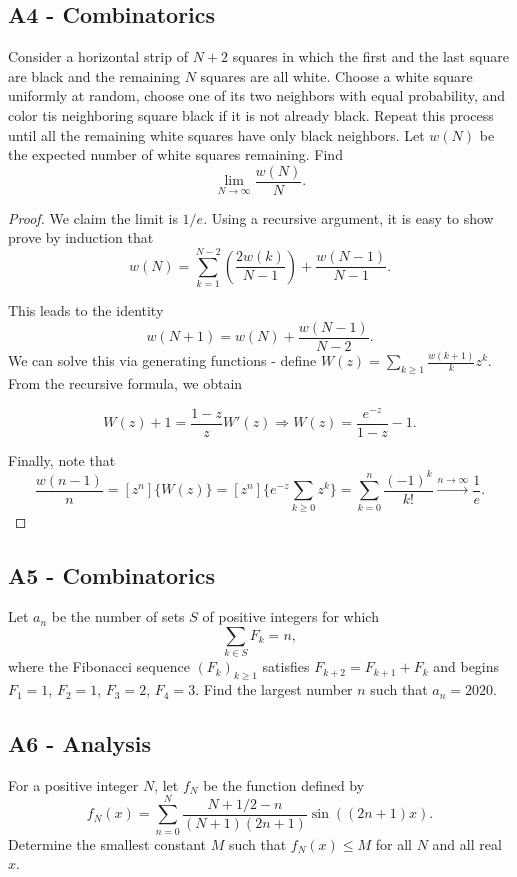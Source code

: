 \documentclass[11pt]{scrartcl}
\newcommand{\<}{\langle}
\renewcommand{\>}{\rangle}
\begin{document}
\subsection{A4 - Combinatorics}
Consider a horizontal strip of $N+2$ squares in which the first and the last square are black and the remaining $N$ squares are all white. Choose a white square uniformly at random, choose one of its two neighbors with equal probability, and color tis neighboring square black if it is not already black. Repeat this process until all the remaining white squares have only black neighbors. Let $w(N)$ be the expected number of white squares remaining. Find
\[ \lim_{N\to\infty}\frac{w(N)}{N}.\]
\begin{proof}
We claim the limit is $1/e$.  Using a recursive argument, it is easy to show prove by induction that 
$$w(N) =  \sum_{k=1}^{N-2}\left ( \frac{2w(k)}{N - 1} \right) + \frac{w(N - 1)}{N - 1}.$$

This leads to the identity
$$w(N + 1) = w(N) + \frac{w(N - 1)}{N - 2}.$$
We can solve this via generating functions - define $W(z) = \sum_{k \ge 1} \frac{w(k + 1)}{k} z^k$.  From the recursive formula, we obtain

$$W(z) + 1 = \frac{1-z}{z} W'(z) \Rightarrow W(z) = \frac{e^{-z}}{1 - z} - 1.$$

Finally, note that 
$$\frac{w(n-1)}{n} = [z^n]\{W(z)\} = [z^n] \{e^{-z} \sum_{k \ge 0} z^k\} = \sum_{k=0}^n \frac{(-1)^k}{k!} \xrightarrow{n \to \infty} \frac{1}{e}.$$
\end{proof}
\pagebreak
\subsection{A5 - Combinatorics}
Let $a_n$ be the number of sets $S$ of positive integers for which
\[ \sum_{k\in S}F_k=n,\]where the Fibonacci sequence $(F_k)_{k\ge 1}$ satisfies $F_{k+2}=F_{k+1}+F_k$ and begins $F_1=1$, $F_2=1$, $F_3=2$, $F_4=3$. Find the largest number $n$ such that $a_n=2020$.
\pagebreak
\subsection{A6 - Analysis}
For a positive integer $N$, let $f_N$ be the function defined by
\[ f_N (x)=\sum_{n=0}^N \frac{N+1/2-n}{(N+1)(2n+1)} \sin\left((2n+1)x \right). \]Determine the smallest constant $M$ such that $f_N (x)\le M$ for all $N$ and all real $x$.
\end{document}

